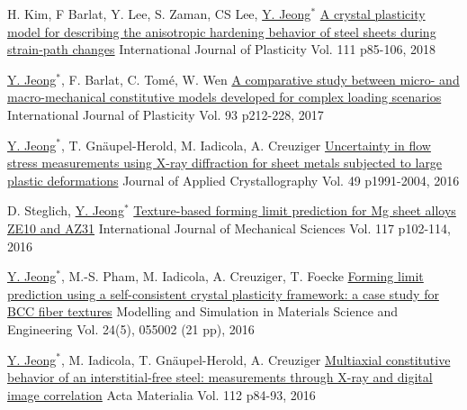 \begin{cventries}
  \cventry
  {H. Kim, F Barlat, Y. Lee, S. Zaman, CS Lee, \underline{Y. Jeong}$^*$}
  {\href{https://doi.org/10.1016/j.ijplas.2018.07.010}{A crystal plasticity model for describing the anisotropic hardening behavior of steel sheets during strain-path changes}}
  {International Journal of Plasticity}
  {Vol. 111 p85-106, 2018}
  {
  }

  \cventry
  {\underline{Y. Jeong}$^*$, F. Barlat, C. Tom\'{e}, W. Wen}
  {\href{http://dx.doi.org/10.1016/j.ijplas.2016.07.015}{A comparative study between micro- and macro-mechanical constitutive models developed for complex loading scenarios}}
  {International Journal of Plasticity}
  {Vol. 93 p212-228, 2017} %
  {
  }

  \cventry
  {\underline{Y. Jeong}$^*$, T. Gn\"{a}upel-Herold, M. Iadicola, A. Creuziger} %
  {\href{https://doi.org/10.1107/S1600576716013662}{Uncertainty in flow stress measurements using X-ray diffraction for sheet metals subjected to large plastic deformations}} %
  {Journal of Applied Crystallography} %
  {Vol. 49 p1991-2004, 2016} %
  {
  }

  \cventry
  {D. Steglich, \underline{Y. Jeong}$^*$}
  {\href{http://dx.doi.org/10.1016/j.ijmecsci.2016.08.013}{Texture-based forming limit prediction for Mg sheet alloys ZE10 and AZ31}}
  {International Journal of Mechanical Sciences} %
  {Vol. 117 p102-114, 2016} %
  {
  }

  \cventry
  {\underline{Y. Jeong}$^*$, M.-S. Pham, M. Iadicola, A. Creuziger, T. Foecke}
  {\href{http://dx.doi.org/10.1088/0965-0393/24/5/055005}{Forming limit prediction using a self-consistent crystal plasticity framework: a case study for BCC fiber textures}}
  {Modelling and Simulation in Materials Science and Engineering}
  {Vol. 24(5), 055002 (21 pp), 2016} %
  {
  }

  \cventry
  {\underline{Y. Jeong}$^*$, M. Iadicola, T. Gn\"{a}upel-Herold, A. Creuziger}
  {\href{http://dx.doi.org/10.1016/j.actamat.2016.04.013}{Multiaxial constitutive behavior of an interstitial-free steel: measurements through X-ray and digital image correlation}}
  {Acta Materialia }
  {Vol. 112 p84-93, 2016}
  {
  }



\end{cventries}
